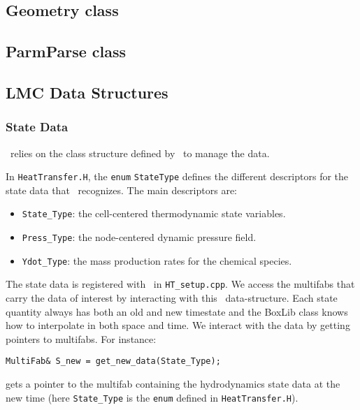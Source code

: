 \subsection{Geometry class}

\subsection{ParmParse class}

\subsection{LMC Data Structures}

\subsubsection{State Data}

\lmc\ relies on the class structure defined by \boxlib\ to manage the
data.

In {\tt HeatTransfer.H}, the {\tt enum} {\tt StateType} defines the
different descriptors for the state data that \lmc\ recognizes.
The main descriptors are:
\begin{itemize}
\item {\tt State\_Type}: the cell-centered thermodynamic state variables.

\item {\tt Press\_Type}: the node-centered dynamic pressure field.

\item {\tt Ydot\_Type}: the mass production rates for the chemical species.  
  
\end{itemize}

The state data is registered with \boxlib\ in {\tt HT\_setup.cpp}.
We access the multifabs that carry the data of interest by interacting
with this \boxlib\ data-structure.  Each state quantity always has both
an old and new timestate and the BoxLib class knows how to interpolate
in both space and time.  We interact with the data by getting pointers
to multifabs.  For instance:
\begin{lstlisting}
MultiFab& S_new = get_new_data(State_Type);
\end{lstlisting}
gets a pointer to the multifab containing the hydrodynamics state data
at the new time (here {\tt State\_Type} is the {\tt enum} defined in 
{\tt HeatTransfer.H}).

